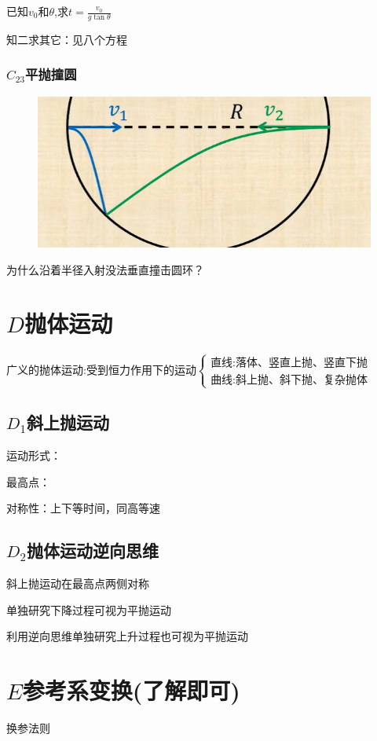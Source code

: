 \documentclass[lang=cn,10pt]{elegantbook}
\begin{document}
         已知$v_0$和$\theta$,求$t=\frac{v_{0}}{g\tan\theta}$
         
         知二求其它：见八个方程
         
         \subsubsection{$C_{23}$平抛撞圆}
         \begin{figure}[H]
         	\centering
         	\includegraphics[width=0.3\linewidth]{image/49}
         \end{figure}
         
         \vspace{3cm}
         为什么沿着半径入射没法垂直撞击圆环？
         \section{$D$抛体运动}
         $\text{广义的抛体运动:受到恒力作用下的运动}\begin{cases}\text{直线:落体、竖直上抛、竖直下抛}\\\text{曲线:斜上抛、斜下抛、复杂抛体}&\end{cases}$
         \subsection{$D_1$斜上抛运动}
         
         \vspace{2cm}
         
         运动形式：
         
         最高点：
         
         对称性：上下等时间，同高等速
         
         \subsection{$D_2$抛体运动逆向思维}
         斜上抛运动在最高点两侧对称
         
         单独研究下降过程可视为平抛运动
         
        利用逆向思维单独研究上升过程也可视为平抛运动
        
        \section{$E$参考系变换(了解即可)}
        换参法则
        
\end{document}
